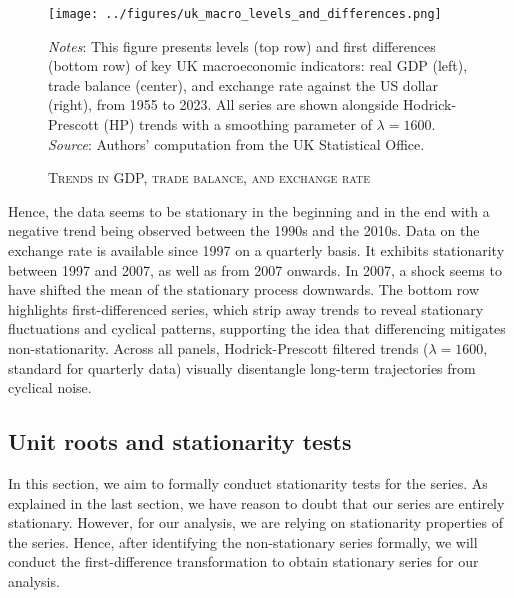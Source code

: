\documentclass[
]{article}
\begin{document}
\begin{figure}[H]

\caption{\large \textsc{Trends in GDP, trade balance, and exchange rate}}\label{fig:trends-plot}

{\centering \texttt{[image: ../figures/uk\_macro\_levels\_and\_differences.png]} 

}

{\footnotesize {\textit{Notes}: This figure presents levels (top row) and 
first differences (bottom row) of key UK macroeconomic indicators: real GDP 
(left), trade balance (center), and exchange rate against the US dollar (right),
from 1955 to 2023. All series are shown alongside Hodrick-Prescott (HP) trends 
with a smoothing parameter of $\lambda=1600$.  \\ \textit{Source}: Authors' 
computation from the UK Statistical Office.
} }

\end{figure}
Hence, the data seems to be
stationary in the beginning and in the end with a negative trend being
observed between the 1990s and the 2010s. Data on the exchange rate is available since
1997 on a quarterly basis. It exhibits stationarity between 1997 and
2007, as well as from 2007 onwards. In 2007, a shock seems to have
shifted the mean of the stationary process downwards. The bottom row highlights first-differenced series, which strip away trends to 
reveal stationary fluctuations and cyclical patterns, supporting the idea that 
differencing mitigates non-stationarity. Across all panels, Hodrick-Prescott 
filtered trends ($\lambda=1600$, standard for quarterly data) visually disentangle 
long-term trajectories from cyclical noise.

\subsection{Unit roots and stationarity tests}

In this section, we aim to formally conduct stationarity tests for the
series. As explained in the last section, we have reason to doubt that
our series are entirely stationary. However, for our analysis, we are
relying on stationarity properties of the series. Hence, after
identifying the non-stationary series formally, we will conduct the
first-difference transformation to obtain stationary series for our
analysis.
\end{document}
